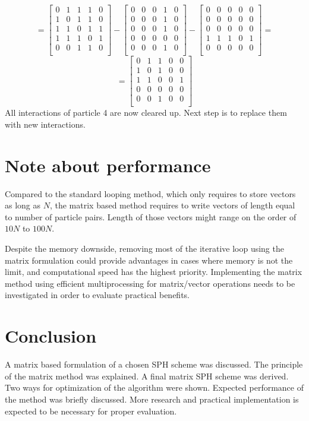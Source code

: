 \documentclass{article}
\begin{document}
$$
=
\begin{bmatrix}
    0 & 1 & 1 & 1 & 0\\
    1 & 0 & 1 & 1 & 0\\
    1 & 1 & 0 & 1 & 1\\
    1 & 1 & 1 & 0 & 1\\
    0 & 0 & 1 & 1 & 0\\
\end{bmatrix}
-
\begin{bmatrix}
    0 & 0 & 0 & 1 & 0\\
    0 & 0 & 0 & 1 & 0\\
    0 & 0 & 0 & 1 & 0\\
    0 & 0 & 0 & 0 & 0\\
    0 & 0 & 0 & 1 & 0\\
\end{bmatrix}
-
\begin{bmatrix}
    0 & 0 & 0 & 0 & 0\\
    0 & 0 & 0 & 0 & 0\\
    0 & 0 & 0 & 0 & 0\\
    1 & 1 & 1 & 0 & 1\\
    0 & 0 & 0 & 0 & 0\\
\end{bmatrix}
=
$$
$$
=
\begin{bmatrix}
    0 & 1 & 1 & 0 & 0\\
    1 & 0 & 1 & 0 & 0\\
    1 & 1 & 0 & 0 & 1\\
    0 & 0 & 0 & 0 & 0\\
    0 & 0 & 1 & 0 & 0\\
\end{bmatrix}
$$
All interactions of particle 4 are now cleared up. Next step is to replace them with new interactions.
\section{Note about performance}
Compared to the standard looping method, which only requires to store vectors as long as $N$, the matrix based method requires to write vectors of length equal to number of particle pairs. Length of those vectors might range on the order of $10N$ to $100N$.

Despite the memory downside, removing most of the iterative loop using the matrix formulation could provide advantages in cases where memory is not the limit, and computational speed has the highest priority. Implementing the matrix method using efficient multiprocessing for matrix/vector operations needs to be investigated in order to evaluate practical benefits.
\section{Conclusion}
A matrix based formulation of a chosen SPH scheme was discussed. The principle of the matrix method was explained. A final matrix SPH scheme was derived. Two ways for optimization of the algorithm were shown. Expected performance of the method was briefly discussed. More research and practical implementation is expected to be necessary for proper evaluation.
\end{document}
